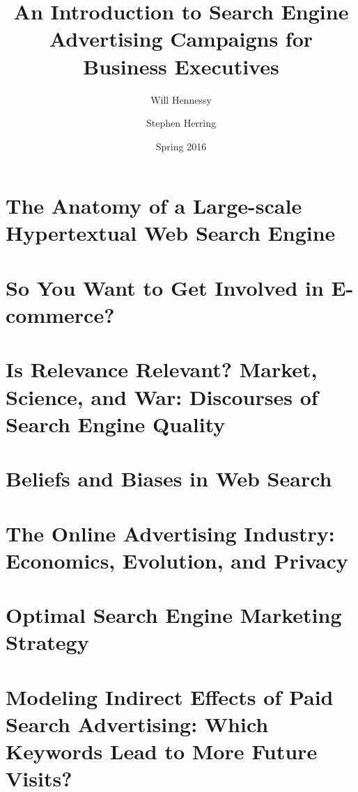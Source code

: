 \documentclass[11pt]{article}
\title{An Introduction to Search Engine Advertising Campaigns for Business Executives}
\author{Will Hennessy \and Stephen Herring}
\date{Spring 2016}
\begin{document}
\maketitle

\thispagestyle{empty}

\setcounter{tocdepth}{1} %

\tableofcontents

\newpage

\clearpage
\setcounter{page}{1}

\section{The Anatomy of a Large-scale Hypertextual Web Search Engine}

\newpage

\section{So You Want to Get Involved in E-commerce?}

\newpage

\section{Is Relevance Relevant? Market, Science, and War:  Discourses of Search Engine Quality}

\newpage

\section{Beliefs and Biases in Web Search}

\newpage

\section{The Online Advertising Industry: Economics, Evolution, and Privacy}

\newpage

\section{Optimal Search Engine Marketing Strategy}

\newpage

\section{Modeling Indirect Effects of Paid Search Advertising: Which Keywords Lead to More Future Visits?}

\newpage
\end{document}
